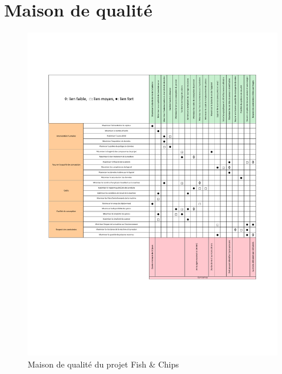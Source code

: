 \newpage


\section{Maison de qualité}

\begin{figure}[htb!]
    \centering
    \includegraphics[width=0.90\linewidth]{fig/maison_de_qualite.pdf}
    \caption{Maison de qualité du projet Fish \& Chips}
    \label{fig:maison_qualite}
\end{figure}




